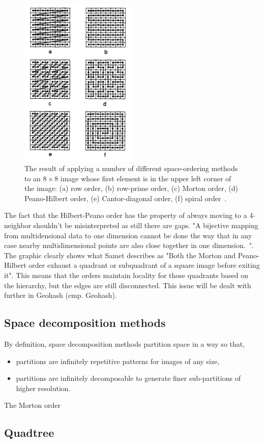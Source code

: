\begin{figure}[h]
  \begin{center}
    \includegraphics[width=0.5\textwidth]{figures/space_orders.png}
    \caption{The result of applying a number of different space-ordering methods to an $8 \times 8$ image whose first element is in the upper left corner of the image: (a) row order, (b) row-prime order, (c) Morton order, (d) Peano-Hilbert order, (e) Cantor-diagonal order, (f) spiral order~\cite[p 14]{Samet90spatialdata}.}
    \label{fig:space-orders}
  \end{center}
\end{figure}

The fact that the Hilbert-Peano order has the property of always moving to a 4-neighbor shouldn't be misinterpreted as still there are gaps. "A bijective mapping from multidensional data to one dimension cannot be done the way that in any case nearby multidimensional points are also close together in one dimension.~\cite{Tropf81multidimensional}". The graphic clearly shows what Samet describes as "Both the Morton and Peano-Hilbert order exhaust a quadrant or subquadrant of a square image before exiting it". This means that the orders maintain locality for those quadrants based on the hierarchy, but the edges are still disconnected. This issue will be dealt with further in Geohash (cmp. Geohash). 

\subsection{Space decomposition methods}

By definition, space decomposition methods partition space in a way so that,
\begin{itemize}
\item partitions are infinitely repetitive patterns for images of any size,
\item partitions are infinitely decomposable to generate finer sub-partitions of higher resolution.~\cite{Samet90spatialdata}
\end{itemize}

The Morton order

\subsection{Quadtree}






